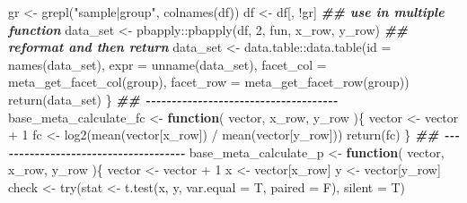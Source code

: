 \documentclass[
]{article}
\newenvironment{Shaded}{\begin{snugshade}}{\end{snugshade}}
\newcommand{\AttributeTok}[1]{\textcolor[rgb]{0.77,0.63,0.00}{#1}}
\newcommand{\ControlFlowTok}[1]{\textcolor[rgb]{0.13,0.29,0.53}{\textbf{#1}}}
\newcommand{\DecValTok}[1]{\textcolor[rgb]{0.00,0.00,0.81}{#1}}
\newcommand{\DocumentationTok}[1]{\textcolor[rgb]{0.56,0.35,0.01}{\textbf{\textit{#1}}}}
\newcommand{\FunctionTok}[1]{\textcolor[rgb]{0.00,0.00,0.00}{#1}}
\newcommand{\NormalTok}[1]{#1}
\newcommand{\OtherTok}[1]{\textcolor[rgb]{0.56,0.35,0.01}{#1}}
\newcommand{\SpecialCharTok}[1]{\textcolor[rgb]{0.00,0.00,0.00}{#1}}
\newcommand{\StringTok}[1]{\textcolor[rgb]{0.31,0.60,0.02}{#1}}
\begin{document}
\begin{Shaded}
\begin{Highlighting}[]
\NormalTok{    gr }\OtherTok{\textless{}{-}} \FunctionTok{grepl}\NormalTok{(}\StringTok{"sample|group"}\NormalTok{, }\FunctionTok{colnames}\NormalTok{(df))}
\NormalTok{    df }\OtherTok{\textless{}{-}}\NormalTok{ df[, }\SpecialCharTok{!}\NormalTok{gr]}
    \DocumentationTok{\#\# use in multiple function}
\NormalTok{    data\_set }\OtherTok{\textless{}{-}}\NormalTok{ pbapply}\SpecialCharTok{::}\FunctionTok{pbapply}\NormalTok{(df, }\DecValTok{2}\NormalTok{, fun, x\_row, y\_row)}
    \DocumentationTok{\#\# reformat and then return}
\NormalTok{    data\_set }\OtherTok{\textless{}{-}}\NormalTok{ data.table}\SpecialCharTok{::}\FunctionTok{data.table}\NormalTok{(}\AttributeTok{id =} \FunctionTok{names}\NormalTok{(data\_set), }\AttributeTok{expr =} \FunctionTok{unname}\NormalTok{(data\_set),}
                                       \AttributeTok{facet\_col =} \FunctionTok{meta\_get\_facet\_col}\NormalTok{(group),}
                                       \AttributeTok{facet\_row =} \FunctionTok{meta\_get\_facet\_row}\NormalTok{(group))}
    \FunctionTok{return}\NormalTok{(data\_set)}
\NormalTok{  \}}
\DocumentationTok{\#\# {-}{-}{-}{-}{-}{-}{-}{-}{-}{-}{-}{-}{-}{-}{-}{-}{-}{-}{-}{-}{-}{-}{-}{-}{-}{-}{-}{-}{-}{-}{-}{-}{-}{-}{-}{-}{-} }
\NormalTok{base\_meta\_calculate\_fc }\OtherTok{\textless{}{-}} 
  \ControlFlowTok{function}\NormalTok{(}
\NormalTok{           vector,}
\NormalTok{           x\_row,}
\NormalTok{           y\_row}
\NormalTok{           )\{}
\NormalTok{    vector }\OtherTok{\textless{}{-}}\NormalTok{ vector }\SpecialCharTok{+} \DecValTok{1}
\NormalTok{    fc }\OtherTok{\textless{}{-}} \FunctionTok{log2}\NormalTok{(}\FunctionTok{mean}\NormalTok{(vector[x\_row]) }\SpecialCharTok{/} \FunctionTok{mean}\NormalTok{(vector[y\_row]))}
    \FunctionTok{return}\NormalTok{(fc)}
\NormalTok{  \}}
\DocumentationTok{\#\# {-}{-}{-}{-}{-}{-}{-}{-}{-}{-}{-}{-}{-}{-}{-}{-}{-}{-}{-}{-}{-}{-}{-}{-}{-}{-}{-}{-}{-}{-}{-}{-}{-}{-}{-}{-}{-} }
\NormalTok{base\_meta\_calculate\_p }\OtherTok{\textless{}{-}} 
  \ControlFlowTok{function}\NormalTok{(}
\NormalTok{           vector,}
\NormalTok{           x\_row,}
\NormalTok{           y\_row}
\NormalTok{           )\{}
\NormalTok{    vector }\OtherTok{\textless{}{-}}\NormalTok{ vector }\SpecialCharTok{+} \DecValTok{1}
\NormalTok{    x }\OtherTok{\textless{}{-}}\NormalTok{ vector[x\_row]}
\NormalTok{    y }\OtherTok{\textless{}{-}}\NormalTok{ vector[y\_row]}
\NormalTok{    check }\OtherTok{\textless{}{-}} \FunctionTok{try}\NormalTok{(stat }\OtherTok{\textless{}{-}} \FunctionTok{t.test}\NormalTok{(x, y, }\AttributeTok{var.equal =}\NormalTok{ T, }\AttributeTok{paired =}\NormalTok{ F), }\AttributeTok{silent =}\NormalTok{ T)}

\end{Highlighting}
\end{Shaded}
\end{document}
